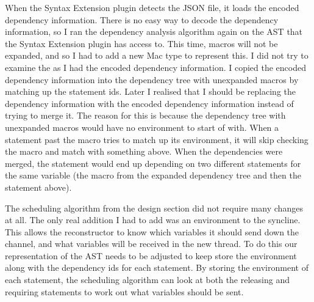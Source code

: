When the Syntax Extension plugin detects the JSON file, it loads the encoded dependency information. There is no easy way to decode the dependency information, so I ran the dependency analysis algorithm again on the AST that the Syntax Extension plugin has access to. This time, macros will not be expanded, and so I had to add a new Mac type to represent this. I did not try to examine the  as I had the encoded dependency information. I copied the encoded dependency information into the dependency tree with unexpanded macros by matching up the statement ids. Later I realised that I should be replacing the dependency information with the encoded dependency information instead of trying to merge it. The reason for this is because the dependency tree with unexpanded macros would have no environment to start of with. When a statement past the macro tries to match up its environment, it will skip checking the macro and match with something above. When the dependencies were merged, the statement would end up depending on two different statements for the same variable (the macro from the expanded dependency tree and then the statement above).

The scheduling algorithm from the design section did not require many changes at all. The only real addition I had to add was an environment to the syncline. This allows the reconstructor to know which variables it should send down the channel, and what variables will be received in the new thread.
To do this our representation of the AST needs to be adjusted to keep store the environment along with the dependency ids for each statement. By storing the environment of each statement, the scheduling algorithm can look at both the releasing and requiring statements to work out what variables should be sent.

